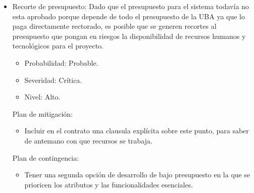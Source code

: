 \begin{itemize}
\bigskip

\item Recorte de presupuesto: Dado que el presupuesto para el sistema todav\'ia no esta aprobado porque depende de todo el presupuesto de la UBA ya que lo paga directamente rectorado, es posible que se generen recortes al presupuesto que pongan en riesgos la disponibilidad de recursos humanos y tecnol\'ogicos para el proyecto.
\begin{itemize}
\item Probabilidad: Probable.
\item Severidad: Cr\'itica.
\item Nivel: Alto.
\end{itemize}
\medskip
Plan de mitigación:
\begin{itemize}
\item Incluir en el contrato una clausula expl\'icita sobre este punto, para saber de antemano con que recursos se trabaja.
\end{itemize}
\medskip
Plan de contingencia:
\begin{itemize}
\item Tener una segunda opci\'on de desarrollo de bajo presupuesto en la que se prioricen los atributos y las funcionalidades esenciales.
\end{itemize}


\end{itemize}

